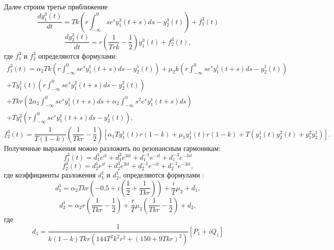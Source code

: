 \documentclass[12pt]{article}
\begin{document}
Далее строим третье приближение
\begin{equation}\label{s3}
       \frac{d y^3_1(t)}{d t}=T k \left(r \int_{-\infty}^{0} s e^{s}y^3_1(t+s)d s -  y^3_2 (t) \right) + f^3_1 (t)
   \end{equation}
   \begin{equation*}
   \frac{d y^3_2(t)}{d t}= r\left(\frac{1}{T r k} -\frac{1}{2}\right)y^3_1(t)+f^3_2 (t) ,
\end{equation*}
где $ f^3_1 $ и $f^3_2$ определяются формулами:
\begin{multline}
    f^3_1 (t)=\alpha_2 T k \left( r \int_{-\infty}^{0} s e^{s} y^1_1 (t+s) d s - y^1_2 (t) \right)+\mu_2 k \left( r \int_{-\infty}^{0} s e^{s} y^1_1 (t+s) d s - y^1_2 (t) \right)\\ +T y^1_1 (t) \left( r \int_{-\infty}^{0} s e^{s} y^2_1 (t+s) d s - y^2_2 (t) \right) \\+T k r \left(  2  \alpha_2 \int_{-\infty}^{0} s e^{s} y^1_1 (t+s)d s +  \alpha_2 \int_{-\infty}^{0}s^2 e^{s} y^1_1(t+s) d s     \right) \\+T y^2_1 \left( r \int_{-\infty}^{0}s e^s y^1_1(t+s) d s - y^1_2(t)\right),
    \end{multline}
    \begin{equation*}
    f^3_2(t)=\frac{1}{T (1-k)}\left( \frac{1}{T k r} - \frac{1}{2} \right)\left[ \alpha_1 T y^1_1(t)r(1-k)+\mu_1 y^1_1 (t)r(1-k) + T( y^1_1(t) y^2_2(t)     + y^2_1 y^1_2  )\right].
    \end{equation*}
Полученные выражения можно разложить по резонансным гармоникам:
 \begin{equation}
      f^3_1(t)=d^1_1 e^{i t}+d^3_1 e^{3 i t} +d^{-1}_1e^{-i t}+d^{-3}_1 e^{-3 i t}
    \end{equation}
    \begin{equation*}
      f^3_2(t)=d^1_2 e^{i t}+d^3_2 e^{3 i t} +d^{-1}_2e^{-i t}+d^{-3}_2 e^{-3 i t},
    \end{equation*}
где коэффициенты разложения $ d^1_1 $ и $ d^1_2 $, определяются формулами :
\begin{equation*}
    d^1_1=\alpha_2 T k r \left ( -0.5+i(\frac{1}{2}+\frac{1}{T k r}) \right)+\frac{i}{T} \mu_2+d_1,
\end{equation*}
\begin{equation*}
    d^1_2=\alpha_2  r \left ( \frac{1}{T k r}-\frac{1}{2} \right)+\frac{r}{T} \mu_2 \left ( \frac{1}{T k r}-\frac{1}{2} \right)+d_2,
\end{equation*}
где 
\begin{equation*}
     d_1=\frac{1}{k(1-k)T k r (144 T^2 k^2 r^2 + (150+9 T k r)^2)}[ P_1 + i Q_1]
\end{equation*}
\end{document}
